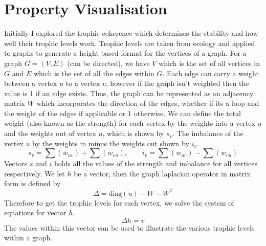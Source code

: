 \documentclass[12pt]{article}
\begin{document}
\section{Property Visualisation}
Initially I explored the trophic coherence\cite{1} which determines the stability and how well their trophic levels work. Trophic levels are taken from ecology and applied to graphs to generate a height based format for the vertices of a graph. For a graph $G =(V,E)$ (can be directed), we have $V$ which is the set of all vertices in $G$ and $E$ which is the set of all the edges within $G$. Each edge can carry a weight between a vertex $u$ to a vertex $v$, however if the graph isn't weighted then the value is 1 if an edge exists. Thus, the graph can be represented as an adjacency matrix $W$ which incorporates the direction of the edges, whether if its a loop and the weight of the edges if applicable or 1 otherwise. We can define the total weight (also known as the strength) for each vertex by the weights into a vertex $u$ and the weights out of vertex $u$, which is shown by $s_v$. The imbalance of the vertex $u$ by the weights in minus the weights out shown by $i_v$.
$$ s_v = \sum(w_{uv}) + \sum(w_{vu}),\qquad i_v = \sum(w_{uv}) - \sum(w_{vu})$$
Vectors $s$ and $i$ holds all the values of the strength and imbalance for all vertices respectively. We let $h$ be a vector, then the graph laplacian operator in matrix form is defined by
$$\Delta = \text{diag}(u) - W - W^T$$
Therefore to get the trophic levels for each vertex, we solve the system of equations for vector $h$.
$$\Delta h = v $$
The values within this vector can be used to illustrate the various trophic levels\cite{2} within a graph. 
\\
\end{document}
